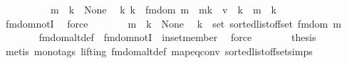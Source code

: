 \begin{isabellebody}
\ \ \isamarkupfalse%
\ {\isacharminus}{\kern0pt}\isanewline
\ \ \ \ \isamarkupfalse%
\ {\isacartoucheopen}m\ {\isachardollar}{\kern0pt}{\isachardollar}{\kern0pt}\ k\ {\isacharequal}{\kern0pt}\ None{\isacartoucheclose}\ \isamarkupfalse%
\ {\isachardoublequoteopen}{\isasymAnd}k{\isacharprime}{\kern0pt}{\isachardot}{\kern0pt}\ k{\isacharprime}{\kern0pt}\ {\isasymin}\ fmdom{\isacharprime}{\kern0pt}\ m\ {\isasymLongrightarrow}\ m{\isacharparenleft}{\kern0pt}k\ {\isachardollar}{\kern0pt}{\isachardollar}{\kern0pt}{\isacharcolon}{\kern0pt}{\isacharequal}{\kern0pt}\ v{\isacharparenright}{\kern0pt}\ {\isachardollar}{\kern0pt}{\isachardollar}{\kern0pt}{\isacharbang}{\kern0pt}\ k{\isacharprime}{\kern0pt}\ {\isacharequal}{\kern0pt}\ m\ {\isachardollar}{\kern0pt}{\isachardollar}{\kern0pt}{\isacharbang}{\kern0pt}\ k{\isacharprime}{\kern0pt}{\isachardoublequoteclose}\isanewline
\ \ \ \ \ \ \isamarkupfalse%
\ fmdom{\isacharprime}{\kern0pt}{\isacharunderscore}{\kern0pt}notI\ \isamarkupfalse%
\ force\isanewline
\ \ \ \ \isamarkupfalse%
\ \isamarkupfalse%
\ {\isacartoucheopen}m\ {\isachardollar}{\kern0pt}{\isachardollar}{\kern0pt}\ k\ {\isacharequal}{\kern0pt}\ None{\isacartoucheclose}\ \isamarkupfalse%
\ {\isachardoublequoteopen}k\ {\isasymnotin}\ set\ {\isacharparenleft}{\kern0pt}sorted{\isacharunderscore}{\kern0pt}list{\isacharunderscore}{\kern0pt}of{\isacharunderscore}{\kern0pt}fset\ {\isacharparenleft}{\kern0pt}fmdom\ m{\isacharparenright}{\kern0pt}{\isacharparenright}{\kern0pt}{\isachardoublequoteclose}\isanewline
\ \ \ \ \ \ \isamarkupfalse%
\ fmdom{\isacharprime}{\kern0pt}{\isacharunderscore}{\kern0pt}alt{\isacharunderscore}{\kern0pt}def\ \ fmdom{\isacharprime}{\kern0pt}{\isacharunderscore}{\kern0pt}notI\ \ in{\isacharunderscore}{\kern0pt}set{\isacharunderscore}{\kern0pt}member\ \isamarkupfalse%
\ force\isanewline
\ \ \ \ \isamarkupfalse%
\ \isamarkupfalse%
\ {\isacharquery}{\kern0pt}thesis\isanewline
\ \ \ \ \ \ \isamarkupfalse%
\ {\isacharparenleft}{\kern0pt}metis\ {\isacharparenleft}{\kern0pt}mono{\isacharunderscore}{\kern0pt}tags{\isacharcomma}{\kern0pt}\ lifting{\isacharparenright}{\kern0pt}\ fmdom{\isacharprime}{\kern0pt}{\isacharunderscore}{\kern0pt}alt{\isacharunderscore}{\kern0pt}def\ map{\isacharunderscore}{\kern0pt}eq{\isacharunderscore}{\kern0pt}conv\ sorted{\isacharunderscore}{\kern0pt}list{\isacharunderscore}{\kern0pt}of{\isacharunderscore}{\kern0pt}fset{\isacharunderscore}{\kern0pt}simps{\isacharparenleft}{\kern0pt}{}{\isacharparenright}{\kern0pt}{\isacharparenright}{\kern0pt}\isanewline

\end{isabellebody}
